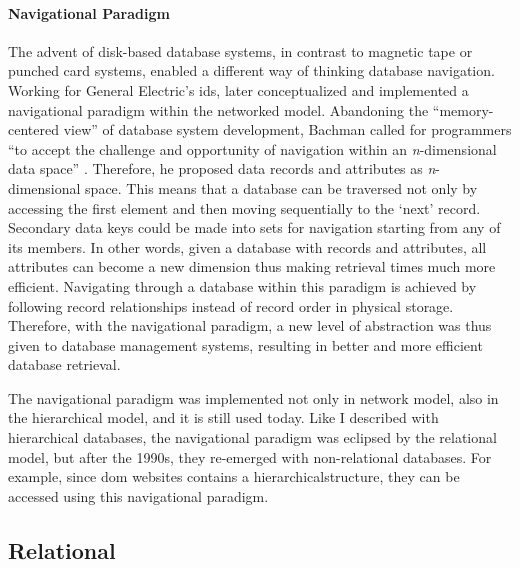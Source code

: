 \paragraph{Navigational Paradigm}  The advent of disk-based database systems, in contrast to magnetic tape or punched card systems, enabled a different way of thinking database navigation. Working for General Electric's \gls{ids}, \textcite{Bachman:1973:PN:355611.362534} later conceptualized and implemented a navigational paradigm within the networked model. Abandoning the ``memory-centered view'' of database system development, Bachman called for programmers ``to accept the challenge and opportunity of navigation within an \textit{n}-dimensional data space'' \parencite[657]{Bachman:1973:PN:355611.362534}. Therefore, he proposed data records and attributes as \textit{n}-dimensional space. This means that a database can be traversed not only by accessing the first element and then moving sequentially to the `next' record. Secondary data keys could be made into sets for navigation starting from any of its members. In other words, given a database with records and attributes, all attributes can become a new dimension thus making retrieval times much more efficient. Navigating through a database within this paradigm is achieved by following record relationships instead of record order in physical storage. Therefore, with the navigational paradigm, a new level of abstraction was thus given to database management systems, resulting in better and more efficient database retrieval.

The navigational paradigm was implemented not only in network model, also in the hierarchical model, and it is still used today. Like I described with hierarchical databases, the navigational paradigm was eclipsed by the relational model, but after the 1990s, they re-emerged with non-relational databases. For example, since \gls{dom} websites contains a hierarchicalstructure, they can be accessed using this navigational paradigm.

\subsection{Relational}
\label{model:relational}


